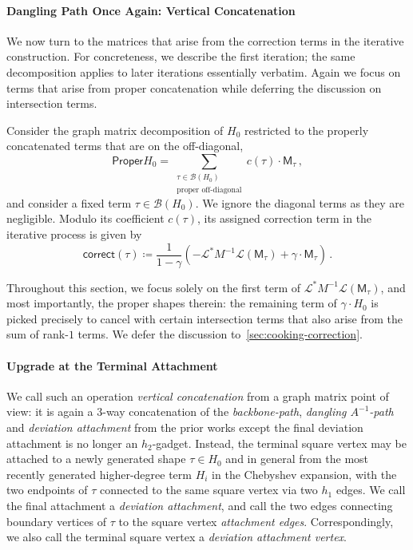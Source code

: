 \documentclass[12pt]{article}
\newcommand{\calB}{\mathcal{B}}
\newcommand{\gam}{\gamma}
\newcommand{\cm}{\mathsf{M} }
\newcommand{\corr}{\mathsf{correct}}
\newcommand{\calL}{\mathcal{L}}
\begin{document}
\paragraph{Dangling Path Once Again: Vertical Concatenation} 

 We now turn to the matrices that arise from the correction terms in the
iterative construction. For concreteness, we describe the first iteration; the
same decomposition applies to later iterations essentially verbatim. Again we focus on terms that arise from proper concatenation while deferring the discussion on intersection terms.

Consider the graph matrix decomposition of $H_{0}$ restricted to the properly concatenated terms that are on the off-diagonal, 
\[ 
\mathsf{Proper} H_{0} = \sum_{\substack{\tau \in \calB(H_{0})\\ \text{proper off-diagonal}}} c(\tau) \cdot \cm_\tau \,,
\]
and consider a fixed term $\tau \in \calB(H_{0})$. We ignore the diagonal terms as they are negligible. Modulo its coefficient $c(\tau)$, its assigned correction term in the iterative process is given by \[ 
\corr(\tau) \coloneqq \frac{1}{1-\gamma} \left(- \calL^*M^{-1}\calL(\cm_\tau)  + \gam \cdot \cm_\tau  \right)\,.
\]

Throughout this section, we focus solely on the first term of $  \calL^*M^{-1}\calL(\cm_\tau)$, and most importantly, the proper shapes therein: the remaining term of $\gam \cdot H_{0}$ is picked precisely to cancel with certain intersection terms that also arise from the sum of rank-$1$ terms. We defer the discussion to~\cref{sec:cooking-correction}.

\paragraph{Upgrade at the Terminal Attachment}
 We call such an operation \emph{vertical concatenation} from a graph matrix point of view: it is again a $3$-way concatenation of the \emph{backbone-path}, \emph{dangling $A^{-1}$-path} and \emph{deviation attachment} from the prior works except the final deviation attachment is no longer an $h_2$-gadget. Instead, the
terminal square vertex may be attached to a newly generated shape
\(\tau \in H_{0} \) and in general from the most recently generated higher-degree term $H_i$ in the Chebyshev expansion, with the two endpoints of \(\tau\)
connected to the same square vertex via two $h_1$ edges. We call the final attachment a \emph{deviation attachment}, and call the two edges connecting boundary vertices of $\tau$ to the square vertex \emph{attachment edges}. Correspondingly, we also call the terminal square vertex a \emph{deviation attachment vertex}.
 
\end{document}
